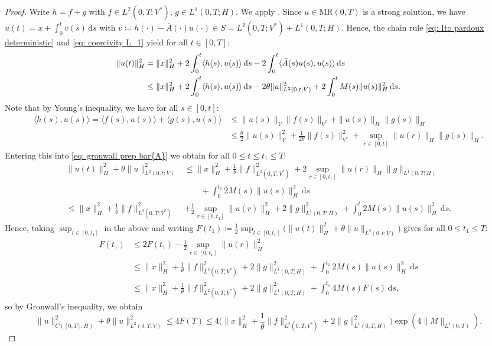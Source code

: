 \documentclass{amsart}
\newcommand{\dd}{\,\mathrm{d}}
\renewcommand{\MR}{\mathrm{MR}}
\newcommand{\<}{\langle}
\newcommand{\?}{\rangle}
\theoremstyle{plain}
\theoremstyle{remark}
\theoremstyle{plain}
\numberwithin{equation}{section}
\begin{document}
\begin{proof}
Write $h=f+g$ with $f\in L^2(0,T;V^*)$, $g\in L^1(0,T;H)$.
We apply \cite[Th. 2.2]{pardoux}. Since $u\in\MR(0,T)$ is a strong solution, we have $u(t)=x+\int_0^t v(s)\dd s$ with $v\coloneqq h(\cdot)-\bar{A}(\cdot)u(\cdot)\in S=L^2(0,T;V^*)+L^1(0,T;H)$.
Hence, the chain rule \eqref{eq: Ito pardoux deterministic} and \eqref{eq: coercivity L_1} yield for all $t\in[0,T]$:
\begin{align}
\|u(t)\|_H^2 &=\|x\|_H^2+2\int_0^t \<h(s),u(s)\?\dd s-2\int_{0}^{t} \<\bar{A}(s)u(s),u(s)\?\dd s\notag\\
&\leq \|x\|_H^2+2\int_0^t \<h(s),u(s)\?\dd s-2\theta\|u\|_{L^2(0,t;V)}^2+2\int_0^t M(s)\|u(s)\|_H^2\dd s.\label{eq: gronwall prep bar{A}}
\end{align}
Note that by Young's inequality, we have for all $s\in[0,t]$:
\begin{align*}
\<h(s),u(s)\?=\<f(s),u(s)\?+\<g(s),u(s)\?
&\leq \|u(s)\|_{V}\|f(s)\|_{V^*}+\|u(s)\|_{H}\|g(s)\|_{H}\\
&\leq \frac{\theta}{2}\|u(s)\|_V^2+\frac{1}{2\theta}\|f(s)\|_{V^*}^2+\sup_{r\in[0,t]}\|u(r)\|_H\|g(s)\|_H.
\end{align*}
Entering this into \eqref{eq: gronwall prep bar{A}} we obtain for all $0\leq t\leq t_1\leq T$:
\begin{align*}
\|u(t)\|_H^2+\theta\|u\|_{L^2(0,t;V)}^2&\leq \|x\|_H^2+\frac{1}{\theta}\|f\|_{L^2(0,T;V^*)}^2 +2\sup_{r\in[0,t_1]}\|u(r)\|_H\|g\|_{L^1(0,T;H)}\\
&\qquad+\int_0^{t_1} 2M(s)\|u(s)\|_H^2\dd s\\
\leq \|x\|_H^2+\frac{1}{\theta}\|f\|_{L^2(0,T;V^*)}^2 &+\frac{1}{2}\sup_{r\in[0,t_1]}\|u(r)\|_H^2+2\|g\|_{L^1(0,T;H)}^2 +\int_0^t 2M(s) \|u(s)\|_H^2  \dd s.
\end{align*}
Hence, taking $\sup_{t\in[0,t_1]}$ in the above and writing $F(t_1)\coloneqq \frac{1}{2}\sup_{t\in[0,t_1]}\big(\|u(t)\|_H^2+\theta\|u\|_{L^2(0,t;V)}\big)$ gives for all $0\leq t_1\leq T$:
\begin{align*}
F(t_1)&\leq 2F(t_1)-\frac{1}{2}\sup_{r\in[0,t_1]}\|u(r)\|_H^2\\
&\leq \|x\|_H^2+\frac{1}{\theta}\|f\|_{L^2(0,T;V^*)}^2 +2\|g\|_{L^1(0,T;H)}^2 +\int_0^{t_1} 2M(s) \|u(s)\|_H^2  \dd s\\
&\leq \|x\|_H^2+\frac{1}{\theta}\|f\|_{L^2(0,T;V^*)}^2 +2\|g\|_{L^1(0,T;H)}^2 +\int_0^{t_1} 4M(s) F(s)  \dd s,
\end{align*}
so by Gronwall's inequality, we obtain
\[
\|u\|_{C([0,T];H)}^2+\theta\|u\|_{L^2(0,T;V)}^2\leq 4F(T)\leq 4\big(\|x\|_H^2+\frac{1}{\theta}\|f\|_{L^2(0,T;V^*)}^2 +2\|g\|_{L^1(0,T;H)}^2\big)\exp(4\|M\|_{L^1(0,T)}).
\]
\end{proof}
\end{document}

